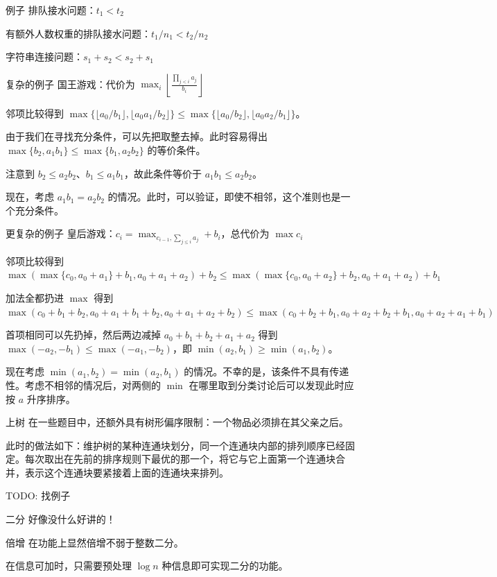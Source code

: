 \documentclass[11pt,aspectratio=169]{beamer}
\begin{document}
\begin{frame}{例子}
    排队接水问题：$t_1<t_2$

    有额外人数权重的排队接水问题：$t_1/n_1<t_2/n_2$

    字符串连接问题：$s_1+s_2<s_2+s_1$
\end{frame}
\begin{frame}{复杂的例子}
    国王游戏：代价为 $\displaystyle\max_i\left\lfloor\frac{\prod_{j<i}a_j}{b_i}\right\rfloor$

    邻项比较得到 $\max\{\lfloor a_0/b_1\rfloor,\lfloor a_0a_1/b_2\rfloor\}\le\max\{\lfloor a_0/b_2\rfloor,\lfloor a_0a_2/b_1\rfloor\}$。

    由于我们在寻找充分条件，可以先把取整去掉。此时容易得出 $\max\{b_2,a_1b_1\}\le\max\{b_1,a_2b_2\}$ 的等价条件。

    注意到 $b_2\le a_2b_2$、$b_1\le a_1b_1$，故此条件等价于 $a_1b_1\le a_2b_2$。

    现在，考虑 $a_1b_1=a_2b_2$ 的情况。此时，可以验证，即使不相邻，这个准则也是一个充分条件。
\end{frame}
\begin{frame}{更复杂的例子}
    皇后游戏：$c_i=\max_{c_{i-1},\sum_{j\le i}a_j}+b_i$，总代价为 $\max c_i$

    邻项比较得到 $\max(\max\{c_0,a_0+a_1\}+b_1,a_0+a_1+a_2)+b_2\le \max(\max\{c_0,a_0+a_2\}+b_2,a_0+a_1+a_2)+b_1$

    加法全都扔进 $\max$ 得到 $\max(c_0+b_1+b_2,a_0+a_1+b_1+b_2,a_0+a_1+a_2+b_2)\le \max(c_0+b_2+b_1,a_0+a_2+b_2+b_1,a_0+a_2+a_1+b_1)$

    首项相同可以先扔掉，然后两边减掉 $a_0+b_1+b_2+a_1+a_2$ 得到 $\max(-a_2,-b_1)\le \max(-a_1,-b_2)$，即 $\min(a_2,b_1)\ge \min(a_1,b_2)$。

    现在考虑 $\min(a_1,b_2)=\min(a_2,b_1)$ 的情况。不幸的是，该条件不具有传递性。考虑不相邻的情况后，对两侧的 $\min$ 在哪里取到分类讨论后可以发现此时应按 $a$ 升序排序。
\end{frame}
\begin{frame}{上树}
    在一些题目中，还额外具有树形偏序限制：一个物品必须排在其父亲之后。

    此时的做法如下：维护树的某种连通块划分，同一个连通块内部的排列顺序已经固定。每次取出在先前的排序规则下最优的那一个，将它与它上面第一个连通块合并，表示这个连通块要紧接着上面的连通块来排列。
\end{frame}
\begin{frame}
    TODO: 找例子  
\end{frame}
\begin{frame}{二分}
    好像没什么好讲的！
\end{frame}
\begin{frame}{倍增}
    在功能上显然倍增不弱于整数二分。
    
    在信息可加时，只需要预处理 $\log n$ 种信息即可实现二分的功能。
\end{frame}
\end{document}
